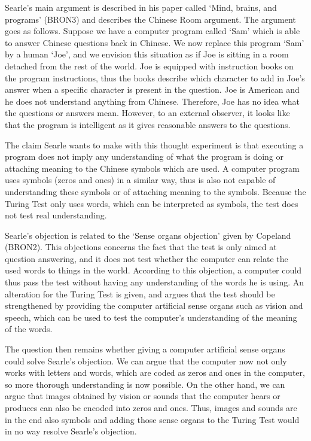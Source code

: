 Searle’s main argument is described in his paper called ‘Mind, brains, and programs’ (BRON3) and describes the Chinese Room argument. The argument goes as follows. Suppose we have a computer program called ‘Sam’ which is able to answer Chinese questions back in Chinese. We now replace this program ‘Sam’ by a human ‘Joe’, and we envision this situation as if Joe is sitting in a room detached from the rest of the world. Joe is equipped with instruction books on the program instructions, thus the books describe which character to add in Joe’s answer when a specific character is present in the question. Joe is American and he does not understand anything from Chinese. Therefore, Joe has no idea what the questions or answers mean. However, to an external observer, it looks like that the program is intelligent as it gives reasonable answers to the questions.

The claim Searle wants to make with this thought experiment is that executing a program does not imply any understanding of what the program is doing or attaching meaning to the Chinese symbols which are used. A computer program uses symbols (zeros and ones) in a similar way, thus is also not capable of understanding these symbols or of attaching meaning to the symbols. Because the Turing Test only uses words, which can be interpreted as symbols, the test does not test real understanding.

Searle’s objection is related to the ‘Sense organs objection’ given by Copeland (BRON2). This objections concerns the fact that the test is only aimed at question answering, and it does not test whether the computer can relate the used words to things in the world. According to this objection, a computer could thus pass the test without having any understanding of the words he is using. An alteration for the Turing Test is given, and argues that the test should be strengthened by providing the computer artificial sense organs such as vision and speech, which can be used to test the computer’s understanding of the meaning of the words.

The question then remains whether giving a computer artificial sense organs could solve Searle’s objection. We can argue that the computer now not only works with letters and words, which are coded as zeros and ones in the computer, so more thorough understanding is now possible. On the other hand, we can argue that images obtained by vision or sounds that the computer hears or produces can also be encoded into zeros and ones. Thus, images and sounds are in the end also symbols and adding those sense organs to the Turing Test would in no way resolve Searle’s objection.

